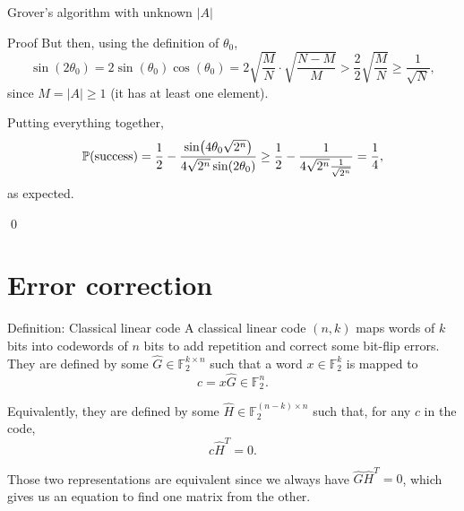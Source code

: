 \documentclass[a4paper]{article}
\begin{document}
\begin{parag}{Grover's algorithm with unknown $\left|A\right|$}
\begin{subparag}{Proof}
        But then, using the definition of $\theta_0$, 
        \[\sin\left(2 \theta_0\right) = 2 \sin\left(\theta_0\right) \cos\left(\theta_0\right) = 2 \sqrt{\frac{M}{N}} \cdot  \sqrt{\frac{N-M}{M}} > \frac{2}{2} \sqrt{\frac{M}{N}} \geq \frac{1}{\sqrt{N}},\]
        since $M = \left|A\right| \geq 1$ (it has at least one element).

        Putting everything together, 
        \[\prob\left(\text{success}\right) = \frac{1}{2} - \frac{\sin\left(4 \theta_0 \sqrt{2^n}\right)}{4 \sqrt{2^n} \sin\left(2\theta_0\right)} \geq \frac{1}{2} - \frac{1}{4 \sqrt{2^n} \frac{1}{\sqrt{2^n}}} = \frac{1}{4},\]
        as expected.

        \qed
    \end{subparag}
\end{parag}


\section{Error correction}

\begin{parag}{Definition: Classical linear code}
    A classical linear code $\left(n, k\right)$ maps words of $k$ bits into codewords of $n$ bits to add repetition and correct some bit-flip errors. They are defined by some  $\hat{G} \in \mathbb{F}_2^{k \times n}$ such that a word $x \in \mathbb{F}_2^k$ is mapped to 
    \[c = x \hat{G} \in \mathbb{F}_2^{n}.\]

    Equivalently, they are defined by some  $\hat{H} \in \mathbb{F}_2^{\left(n-k\right) \times n}$ such that, for any $c$ in the code,
    \[c \hat{H}^T = 0.\]

    Those two representations are equivalent since we always have $\hat{G}\hat{H}^T = 0$, which gives us an equation to find one matrix from the other.
\end{parag}
\end{document}
